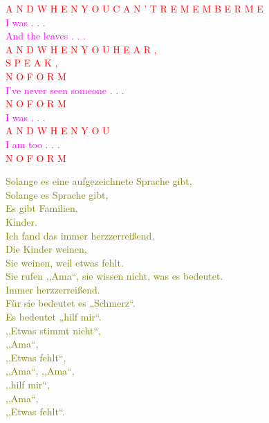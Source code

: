 \documentclass[11pt]{article}
\begin{document}
\begingroup
\begin{center}
\textcolor{red}{A N D \hspace{10mm} W H E N  \hspace{10mm} Y O U  \hspace{10mm} C A N ' T  \hspace{10mm} R E M E M B E R  \hspace{10mm} M E} \\ \textcolor{magenta}{ I was . . . \\ And the leaves . . . } \\ \textcolor{red}{A N D \hspace{10mm} W H E N \hspace{10mm} Y O U \hspace{10mm} H E A R , \\ S P E A K ,  \\ N O \hspace{10mm} F O R M  } \\ \textcolor{magenta}{ I've never seen someone . . . } \\ \textcolor{red}{N O \hspace{10mm} F O R M \\} \textcolor{magenta}{I was . . .} \\ \textcolor{red}{A N D \hspace{10mm} W H E N \hspace{10mm} Y O U} \\ \textcolor{magenta}{I am too . . . } \\ \textcolor{red}{N O \hspace{10mm} F O R M}
\end{center}
\endgroup

\vspace*{1\baselineskip}

\begingroup
\begin{center}
\textcolor{olive}{Solange es eine aufgezeichnete Sprache gibt, \\ Solange es Sprache gibt, \\ Es gibt Familien, \\ Kinder. \\ Ich fand das immer herzzerreißend. \\ Die Kinder weinen, \\ Sie weinen, weil etwas fehlt. \\ 
Sie rufen ,,Ama“, sie wissen nicht, was es bedeutet. \\ Immer herzzerreißend. \\ Für sie bedeutet es „Schmerz“. \\ Es bedeutet „hilf mir“. \\ ,,Etwas stimmt nicht“, \\ ,,Ama“, \\ ,,Etwas fehlt“, \\ ,,Ama“, ,,Ama“, \\ ,,hilf mir“, \\ ,,Ama“, \\ ,,Etwas fehlt“.}
\end{center}
\endgroup
\end{document}
